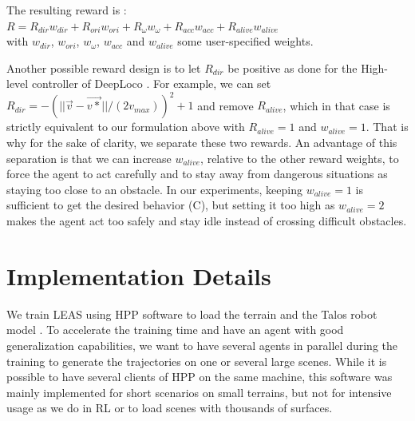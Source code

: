 The resulting reward is :\\
$R = R_{dir} w_{dir} + R_{ori} w_{ori} + R_{\omega} w_{\omega} + R_{acc} w_{acc} + R_{alive} w_{alive}$\\
with $w_{dir}$, $w_{ori}$, $w_{\omega}$, $w_{acc}$ and $w_{alive}$ some user-specified weights.

Another possible reward design is to let $R_{dir}$ be positive as done for the High-level controller of DeepLoco \cite{deepLoco}. 
For example, we can set $R_{dir}=-(||\overrightarrow{v} - \overrightarrow{v*}||/(2 v_{max}))^2 + 1$ and remove $R_{alive}$, which in that case is strictly equivalent to our formulation above with $R_{alive}=1$ and $w_{alive}=1$.
That is why for the sake of clarity, we separate these two rewards. 
An advantage of this separation is that we can increase $w_{alive}$, relative to the other reward weights, to force the agent to act carefully and to stay away from dangerous situations as staying too close to an obstacle. 
In our experiments, keeping $w_{alive}=1$ is sufficient to get the desired behavior (C), but setting it too high as $w_{alive}=2$ makes the agent act too safely and stay idle instead of crossing difficult obstacles.

\section{Implementation Details\label{subsec:leas-implementation}}


We train LEAS using HPP software \cite{HPP} to load the terrain and the Talos robot model \cite{talos_robot}. 
To accelerate the training time and have an agent with good generalization capabilities, we want to have several agents in parallel during the training to generate the trajectories on one or several large scenes. 
While it is possible to have several clients of HPP on the same machine, this software was mainly implemented for short scenarios on small terrains, but not for intensive usage as we do in RL or to load scenes with thousands of surfaces. 


